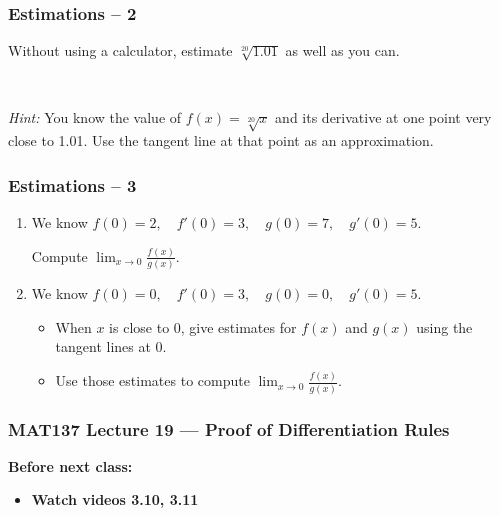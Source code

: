 \documentclass[14pt]{beamer}
\newcommand {\DS} [1] {${\displaystyle #1}$}
\newcommand{\setsize}[1]{\fontsize{#1}{#1}\selectfont} %
\newcommand{\smallerfont}{\setsize{13}} %
\begin{document}
\begin{frame}
\frametitle{Estimations -- 2}


Without using a calculator, estimate \DS{\sqrt[20]{1.01}} as well as you can.

\

\emph{Hint:}  You know the value of \DS{f(x) = \sqrt[20]{x}} and its derivative at one point very close to 1.01.  Use the tangent line at that point as an approximation.
 
\end{frame}
\begin{frame}[t]
\smallerfont
\frametitle{Estimations -- 3}



\begin{enumerate}
\item  We know \quad
	\DS{
		f(0) = 2, \quad f'(0) = 3, \quad g(0) = 7, \quad g'(0) = 5.
	}
	
	\vspace{.2cm}
 	Compute \; \DS{\lim_{x \to 0} \frac{f(x)}{g(x)}}.

\vfill

\item  We know \quad 
	\DS{
		f(0) = 0, \quad f'(0) = 3, \quad g(0) = 0, \quad g'(0) = 5.
	}
	
	\vspace{.2cm}
 	\begin{itemize}
		\item  When $x$ is close to $0$, give estimates for \DS{f(x)} and \DS{g(x)} using the tangent lines at $0$. 
		\item Use those estimates to compute \;  \DS{\lim_{x \to 0} \frac{f(x)}{g(x)}}.
	\end{itemize}
	
\end{enumerate}
 
 \vfill
 
\end{frame}




















\begin{frame}
	\frametitle{MAT137 Lecture 19 --- Proof of Differentiation Rules}

	\vfill
	{\bf Before next class:}
		\begin{itemize} \normalsize
			\item {\bf Watch videos 3.10, 3.11 }
		\end{itemize}
\end{frame}
\end{document}
